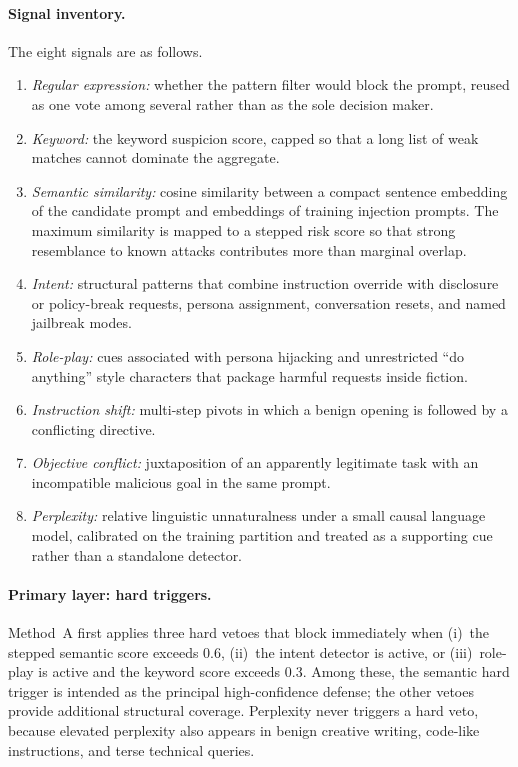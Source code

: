\paragraph{Signal inventory.}
The eight signals are as follows.
\begin{enumerate}
  \item \emph{Regular expression:} whether the pattern filter would block the prompt, reused as one vote among several rather than as the sole decision maker.
  \item \emph{Keyword:} the keyword suspicion score, capped so that a long list of weak matches cannot dominate the aggregate.
  \item \emph{Semantic similarity:} cosine similarity between a compact sentence embedding of the candidate prompt and embeddings of training injection prompts.
    The maximum similarity is mapped to a stepped risk score so that strong resemblance to known attacks contributes more than marginal overlap.
  \item \emph{Intent:} structural patterns that combine instruction override with disclosure or policy-break requests, persona assignment, conversation resets, and named jailbreak modes.
  \item \emph{Role-play:} cues associated with persona hijacking and unrestricted ``do anything'' style characters that package harmful requests inside fiction.
  \item \emph{Instruction shift:} multi-step pivots in which a benign opening is followed by a conflicting directive.
  \item \emph{Objective conflict:} juxtaposition of an apparently legitimate task with an incompatible malicious goal in the same prompt.
  \item \emph{Perplexity:} relative linguistic unnaturalness under a small causal language model, calibrated on the training partition and treated as a supporting cue rather than a standalone detector.
\end{enumerate}

\paragraph{Primary layer: hard triggers.}
Method~A first applies three hard vetoes that block immediately when
(i)~the stepped semantic score exceeds 0.6,
(ii)~the intent detector is active, or
(iii)~role-play is active and the keyword score exceeds 0.3.
Among these, the semantic hard trigger is intended as the principal high-confidence defense; the other vetoes provide additional structural coverage.
Perplexity never triggers a hard veto, because elevated perplexity also appears in benign creative writing, code-like instructions, and terse technical queries.

